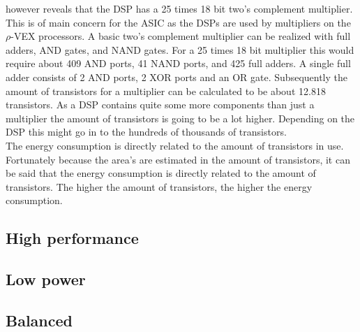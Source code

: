 however reveals that the DSP has a 25 times 18 bit two's complement multiplier. This is of main concern for the ASIC as the DSPs are used by multipliers on the $\rho$-VEX processors. A basic two's complement multiplier can be realized with full adders, AND gates, and NAND gates. For a 25 times 18 bit multiplier this would require about 409 AND ports, 41 NAND ports, and 425 full adders. A single full adder consists of 2 AND ports, 2 XOR ports and an OR gate. Subsequently the amount of transistors for a multiplier can be calculated to be about 12.818 transistors. As a DSP contains quite some more components than just a multiplier the amount of transistors is going to be a lot higher. Depending on the DSP this might go in to the hundreds of thousands of transistors.\\
The energy consumption is directly related to the amount of transistors in use. Fortunately because the area's are estimated in the amount of transistors, it can be said that the energy consumption is directly related to the amount of transistors. The higher the amount of transistors, the higher the energy consumption.


\subsection{High performance}
\subsection{Low power}
\subsection{Balanced}